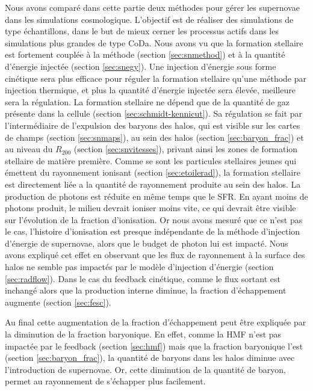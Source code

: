 Nous avons comparé dans cette partie deux méthodes pour gérer les supernovae dans les simulations cosmologique.
L'objectif est de réaliser des simulations de type échantillons, dans le but de mieux cerner les processus actifs dans les simulations plus grandes de type CoDa.
Nous avons vu que la formation stellaire est fortement couplée à la méthode (section \ref{sec:snmethod}) et à la quantité d'énergie injectée (section \ref{sec:snegy}).
Une injection d'énergie sous forme cinétique sera plus efficace pour réguler la formation stellaire qu'une méthode par injection thermique, et plus la quantité d'énergie injectée sera élevée, meilleure sera la régulation.
La formation stellaire ne dépend que de la quantité de gaz présente dans la cellule (section \ref{sec:schmidt-kennicut}).
Sa régulation se fait par l'intermédiaire de l'expulsion des baryons des halos, qui est visible sur les cartes de champs (section \ref{sec:snmaps}), au sein des halos (section \ref{sec:baryon_frac}) et au niveau du $R_{200}$ (section \ref{sec:snvitesses}), privant ainsi les zones de formation stellaire de matière première.
Comme se sont les particules stellaires jeunes qui émettent du rayonnement ionisant (section \ref{sec:etoilerad}), la formation stellaire est directement liée a la quantité de rayonnement produite au sein des halos.
La production de photons est réduite en même temps que le \ac{SFR}.
En ayant moins de photons produit, le milieu devrait ioniser moins vite, ce qui devrait être visible sur l'évolution de la fraction d'ionisation.
Or nous avons mesuré que ce n'est pas le cas, l'histoire d'ionisation est presque indépendante de la méthode d'injection d'énergie de supernovae, alors que le budget de photon lui est impacté.
Nous avons expliqué cet effet en observant que les flux de rayonnement à la surface des halos ne semble pas impactés par le modèle d'injection d'énergie (section \ref{sec:radflow}).
Dans le cas du feedback cinétique, comme le flux sortant est inchangé alors que la production interne diminue, la fraction d'échappement augmente (section \ref{sec:fesc}).

Au final cette augmentation de la fraction d'échappement peut être expliquée par la diminution de la fraction baryonique.
En effet, comme la \ac{HMF} n'est pas impactée par le feedback (section \ref{sec:hmf}) mais que la fraction baryonique l'est (section \ref{sec:baryon_frac}), la quantité de baryons dans les halos diminue avec l'introduction de supernovae.
Or, cette diminution de la quantité de baryon, permet au rayonnement de s'échapper plus facilement.


